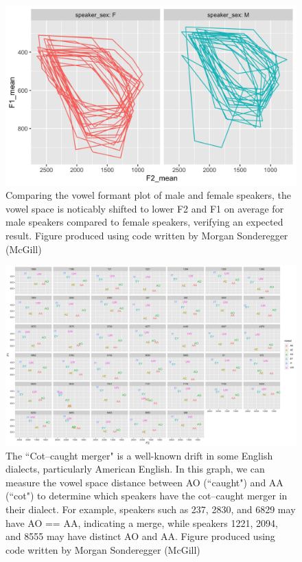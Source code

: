 \documentclass[11pt]{article}
\begin{document}
    \begin{figure}[h]
      \centering
      \includegraphics[scale=0.25]{sex_formant.png}
      \caption{Comparing the vowel formant plot of male and female speakers, the vowel space is noticably shifted to lower F2 and F1 on average for male speakers compared to female speakers, verifying an expected result. Figure produced using code written by Morgan Sonderegger (McGill)}
      \label{fig:sex_formant}
    \end{figure}

    \begin{figure}[h]
      \centering
      \includegraphics[scale=0.15]{dialect-analysis.png}
      \caption{The ``Cot--caught merger" is a well-known drift in some English dialects, particularly American English. In this graph, we can measure the vowel space distance between AO (``caught") and AA (``cot") to determine which speakers have the cot--caught merger in their dialect. For example, speakers such as 237, 2830, and 6829 may have AO == AA, indicating a merge, while speakers 1221, 2094, and 8555 may have distinct AO and AA. Figure produced using code written by Morgan Sonderegger (McGill)}
      \label{fig:dialect-analysis}
    \end{figure}
\end{document}
